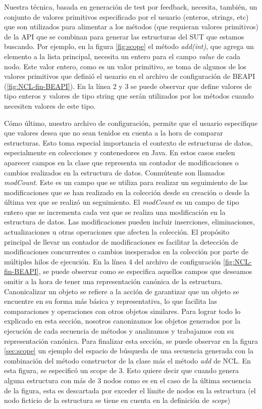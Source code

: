 Nuestra técnica, basada en generación de test por feedback, necesita, también, un conjunto de valores primitivos especificado por el usuario (enteros, strings, etc) que son utilizados para alimentar a los métodos (que requieran valores primitivos) de la API que se combinan para generar las estructuras del SUT que estamos buscando.
Por ejemplo, en la figura \ref{fig:scope} el método \emph{add(int)}, que agrega un elemento a la lista principal, necesita un entero para el campo \emph{value} de cada nodo. Este valor entero, como es un valor primitivo, se toma de algunos de los valores primitivos que definió el usuario en el archivo de configuración de BEAPI (\ref{fig:NCL-fin-BEAPI}). En la línea 2 y 3 se puede observar que define valores de tipo enteros y valores de tipo string que serán utilizados por los métodos cuando necesiten valores de este tipo. 

Cómo último, nuestro archivo de configuración, permite que el usuario especifique que valores desea que no sean tenidos en cuenta a la hora de comparar estructuras. 
Esto toma especial importancia el contexto de estructuras de datos, especialmente en colecciones y contenedores en Java. En estos casos suelen aparecer campos en la clase que representa un contador de modificaciones o cambios realizados en la estructura de datos. Conmútente son llamados \emph{modCount}. Este es un campo que se utiliza para realizar un seguimiento de las modificaciones que se han realizado en la colección desde su creación o desde la última vez que se realizó un seguimiento. El \emph{modCount} es un campo de tipo entero que se incrementa cada vez que se realiza una modificación en la estructura de datos. Las modificaciones pueden incluir inserciones, eliminaciones, actualizaciones u otras operaciones que afecten la colección. El propósito principal de llevar un contador de modificaciones es facilitar la detección de modificaciones concurrentes o cambios inesperados en la colección por parte de múltiples hilos de ejecución. En la línea 4 del archivo de configuración \ref{fig:NCL-fin-BEAPI}, se puede observar como se especifica aquellos campos que deseamos omitir a la hora de tener una representación canónica de la estructura. Canonicalizar un objeto se refiere a la acción de garantizar que un objeto se encuentre en su forma más básica y representativa, lo que facilita las comparaciones y operaciones con otros objetos similares.
Para lograr todo lo explicado en esta sección, nosotros canonizamos los objetos generados por la ejecución de cada secuencia de métodos y analizamos y trabajamos con su representación canónica.
Para finalizar esta sección, se puede observar en la figura \ref{sec:scope} un ejemplo del espacio de búsqueda de una secuencia generada con la combinación del método constructor de la clase más el método \emph{add} de NCL. En esta figura, se especificó un scope de 3. Esto quiere decir que cuando genera alguna estructura con más de 3 nodos como es en el caso de la última secuencia de la figura, esta es descartada por exceder el límite de nodos en la estructura (el nodo ficticio de la estructura se tiene en cuenta en la definición de \emph{scope})


